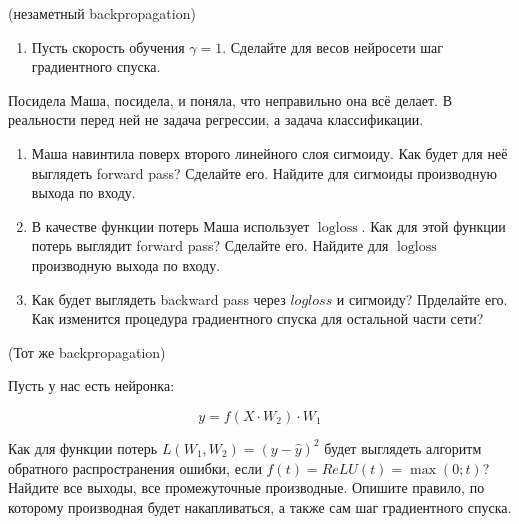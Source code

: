 \documentclass[12pt, a4paper, oneside]{article}
\DeclareMathOperator{\logloss}{logloss}
\theoremstyle{plain} %
\theoremstyle{definition}
\begin{document}
\begin{problem}{(незаметный backpropagation)}
\begin{enumerate}
		\item Пусть скорость обучения $\gamma = 1$.  Сделайте для весов нейросети шаг градиентного спуска. 
	\end{enumerate}
	
	Посидела Маша, посидела, и поняла, что неправильно она всё делает. В реальности перед ней не задача регрессии, а задача классификации. 
	
	\begin{enumerate}	
		\item Маша навинтила поверх второго линейного слоя сигмоиду. Как будет для неё выглядеть forward pass? Сделайте его. Найдите для сигмоиды производную выхода по входу.
		
		\item В качестве функции потерь Маша использует $\logloss.$ Как для этой функции потерь выглядит forward pass? Сделайте его. Найдите для $\logloss$ производную выхода по входу. 
		
		\item Как будет выглядеть backward pass через $logloss$ и сигмоиду? Прделайте его. Как изменится процедура градиентного спуска для остальной части сети? 
	\end{enumerate}
\end{problem} 


\begin{problem}{(Тот же backpropagation)}
		
	Пусть у нас есть нейронка: 
	
	$$ 
	y = f(X \cdot W_2 ) \cdot W_1 
	$$
	
	Как для функции потерь $L(W_1, W_2) = (y - \hat y)^2$ будет выглядеть алгоритм обратного распространения ошибки, если $f(t) = ReLU(t) =  \max(0; t)$? Найдите все выходы, все промежуточные производные.  Опишите правило, по которому производная будет накапливаться, а также сам шаг градиентного спуска. 
\end{problem} 
\end{document}
